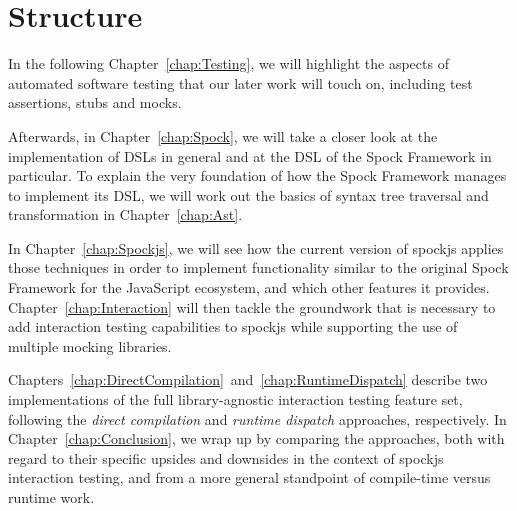 \section{Structure}
In the following Chapter~\ref{chap:Testing},
we will highlight the aspects of automated software testing
that our later work will touch on,
including test assertions, stubs and mocks.

Afterwards, in Chapter~\ref{chap:Spock},
we will take a closer look at the implementation of DSLs in general
and at the DSL of the Spock Framework in particular.
To explain the very foundation of how the Spock Framework
manages to implement its DSL,
we will work out the basics of
syntax tree traversal and transformation
in Chapter~\ref{chap:Ast}.

In Chapter~\ref{chap:Spockjs},
we will see how the current version of spockjs
applies those techniques in order to
implement functionality similar to the original Spock Framework
for the JavaScript ecosystem,
and which other features it provides.
Chapter~\ref{chap:Interaction}
will then tackle the groundwork that is necessary
to add interaction testing capabilities to spockjs
while supporting the use of multiple mocking libraries.

Chapters~\ref{chap:DirectCompilation}~and~\ref{chap:RuntimeDispatch}
describe two implementations of
the full library-agnostic interaction testing feature set,
following the \textit{direct compilation}
and \textit{runtime dispatch}
approaches, respectively.
In Chapter~\ref{chap:Conclusion},
we wrap up by comparing the approaches,
both with regard to their specific upsides and downsides
in the context of spockjs interaction testing,
and from a more general standpoint of
compile-time versus runtime work.
